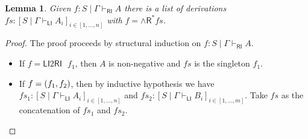 \documentclass[submission,copyright,creativecommons]{eptcs}
\newtheorem{lemma}[theorem]{Lemma}
\theoremstyle{definition}
\newcommand{\andr}{\land \mathsf{R}}
\newcommand{\RI}{\mathsf{RI}}
\newcommand{\LI}{\mathsf{LI}}
\newcommand\niccolo[1]{\mbox{}
{\marginpar{\color{red}NV}}
{\sf\noindent\color{red}#1}}%
\begin{document}
\begin{lemma}\label{lem:RI:invert}
  Given $f : S \mid \Gamma \vdash_{\RI} A$ there is a list of derivations $fs : [S \mid \Gamma \vdash_{\LI} A_i]_{i \in [1 , \dots , n]}$ with $f = \andr^{*} fs$.
\end{lemma}
\begin{proof}
  The proof proceeds by structural induction on $f : S \mid \Gamma \vdash_{\RI} A$.
  \begin{itemize}
    \item If $f = \LI2 \RI \text{ } f_1$, then $A$ is non-negative and $fs$ is the singleton $f_1$.
    \item If $f = \relax(f_1, f_2)$, then by inductive hypothesis we have $fs_1 : [S \mid \Gamma \vdash_{\LI} A_i]_{i \in [1 , \dots , n]}$ and $fs_2 : [S \mid \Gamma \vdash_{\LI} B_i]_{i \in [1 , \dots , m]}$. Take $fs$ as the concatenation of $fs_1$ and $fs_2$.
  \end{itemize}
\end{proof}
\end{document}
